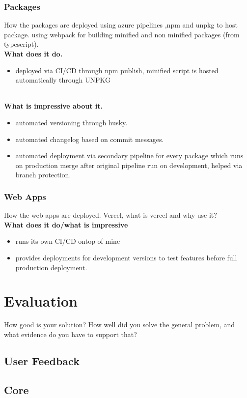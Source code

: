 \documentclass{l4proj}
\begin{document}
\subsection{Packages}
\text How the packages are deployed using azure pipelines ,npm and unpkg to host package. using webpack for building minified and non minified packages (from typescript).
\\
\textbf{What does it do.}
\begin{itemize}
    \item deployed via CI/CD through npm publish, minified script is hosted automatically through UNPKG
\end{itemize}
\\
\textbf{What is impressive about it.}
\begin{itemize}
    \item automated versioning through husky.
    \item automated changelog based on commit messages.
    \item automated deployment via secondary pipeline for every package which runs on production merge after original pipeline run on development, helped via branch protection.
\end{itemize}
\subsection{Web Apps}
\text How the web apps are deployed. Vercel, what is vercel and why use it?
\\
\textbf{What does it do/what is impressive}
\begin{itemize}
    \item runs its own CI/CD ontop of mine
    \item provides deployments for development versions to test features before full production deployment.
\end{itemize}

\chapter{Evaluation} 
How good is your solution? How well did you solve the general problem, and what evidence do you have to support that?

\section{User Feedback}
\section{Core}
\end{document}
